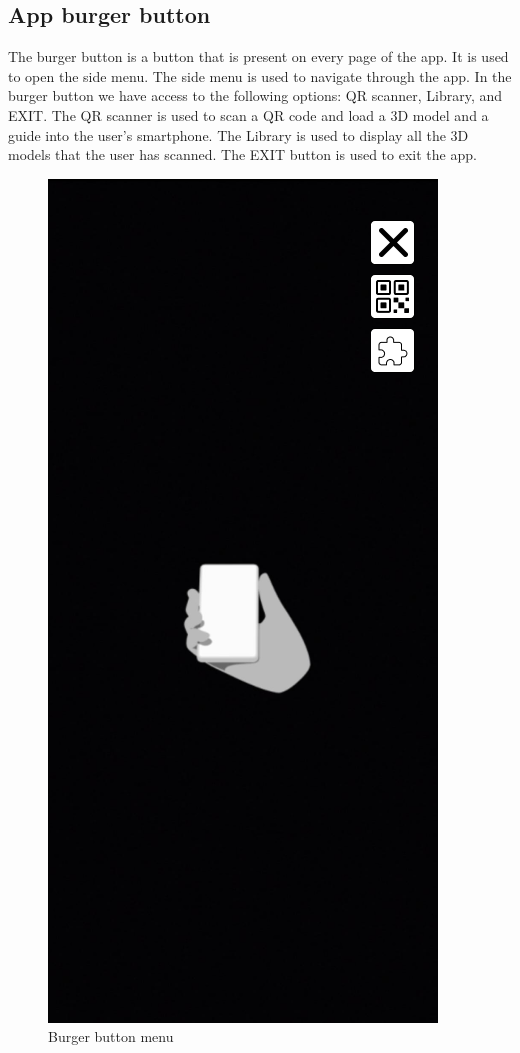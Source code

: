 \subsection{App burger button}
The burger button is a button that is present on every page of the app. It is used to open the side menu. The side menu is used to navigate through the app. In the burger button we have access to the following options: QR scanner, Library, and EXIT.
The QR scanner is used to scan a QR code and load a 3D model and a guide into the user's smartphone. The Library is used to display all the 3D models that the user has scanned. The EXIT button is used to exit the app.
\begin{figure}[h!]
    \begin{center}
        \includegraphics[scale=0.5]{img/App_mock/iPhone 14 - 2.png}
        \caption{Burger button menu}
        \label{fig:burger-button}
    \end{center}
\end{figure}
\pagebreak

